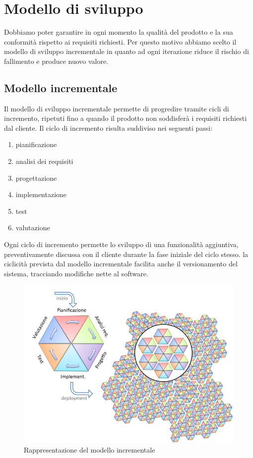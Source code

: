 \section{Modello di sviluppo}

Dobbiamo poter garantire in ogni momento la qualità del prodotto e la sua conformità rispetto ai requisiti richiesti.
Per questo motivo abbiamo scelto il modello di sviluppo incrementale in quanto ad ogni iterazione 
riduce il rischio di fallimento e produce nuovo valore.

\subsection{Modello incrementale}

Il modello di sviluppo incrementale permette di progredire tramite cicli di incremento, 
ripetuti fino a quando il prodotto non soddisferà i requisiti richiesti dal cliente.
Il ciclo di incremento risulta suddiviso nei seguenti passi:
\begin{enumerate}
    \item pianificazione
    \item analisi dei requisiti
    \item progettazione
    \item implementazione
    \item test
    \item valutazione
\end{enumerate}
Ogni ciclo di incremento permette lo sviluppo di una funzionalità aggiuntiva,
preventivamente discussa con il cliente durante la fase iniziale del ciclo stesso.
la ciclicità prevista dal modello incrementale facilita anche il versionamento del sistema,
tracciando modifiche nette al software.

\begin{figure}[H]
    \centering
    \includegraphics[scale = 0.5]{components/img/incrementale.png}
    \caption{Rappresentazione del modello incrementale}
    \label{fig:logo}
\end{figure}

